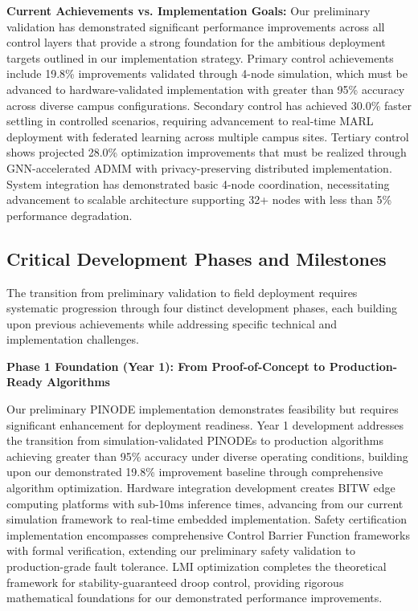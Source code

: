 \documentclass[12pt]{article}
\begin{document}
\textbf{Current Achievements vs. Implementation Goals:} Our preliminary validation has demonstrated significant performance improvements across all control layers that provide a strong foundation for the ambitious deployment targets outlined in our implementation strategy. Primary control achievements include 19.8\% improvements validated through 4-node simulation, which must be advanced to hardware-validated implementation with greater than 95\% accuracy across diverse campus configurations. Secondary control has achieved 30.0\% faster settling in controlled scenarios, requiring advancement to real-time MARL deployment with federated learning across multiple campus sites. Tertiary control shows projected 28.0\% optimization improvements that must be realized through GNN-accelerated ADMM with privacy-preserving distributed implementation. System integration has demonstrated basic 4-node coordination, necessitating advancement to scalable architecture supporting 32+ nodes with less than 5\% performance degradation.

\subsection{Critical Development Phases and Milestones}

The transition from preliminary validation to field deployment requires systematic progression through four distinct development phases, each building upon previous achievements while addressing specific technical and implementation challenges.

\textbf{Phase 1 Foundation (Year 1): From Proof-of-Concept to Production-Ready Algorithms}

Our preliminary PINODE implementation demonstrates feasibility but requires significant enhancement for deployment readiness. Year 1 development addresses the transition from simulation-validated PINODEs to production algorithms achieving greater than 95\% accuracy under diverse operating conditions, building upon our demonstrated 19.8\% improvement baseline through comprehensive algorithm optimization. Hardware integration development creates BITW edge computing platforms with sub-10ms inference times, advancing from our current simulation framework to real-time embedded implementation. Safety certification implementation encompasses comprehensive Control Barrier Function frameworks with formal verification, extending our preliminary safety validation to production-grade fault tolerance. LMI optimization completes the theoretical framework for stability-guaranteed droop control, providing rigorous mathematical foundations for our demonstrated performance improvements.
\end{document}
